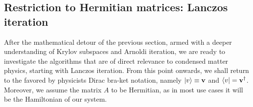 \subsection{Restriction to Hermitian matrices: Lanczos iteration}

After the mathematical detour of the previous section, armed with a deeper understanding of Krylov subspaces and
Arnoldi iteration, we are ready to investigate the algorithms that are of direct relevance to condensed
matter physics, starting with Lanczos iteration. From this point onwards, we shall return to the favored by physicists
Dirac bra-ket notation, namely \(\ket{v} \equiv \vectorbold{v}\) and \(\bra{v} = \vectorbold{v}^{\dagger}\).
Moreover, we assume the matrix \(A\) to be Hermitian, as in most use cases it will be the Hamiltonian of our system.

